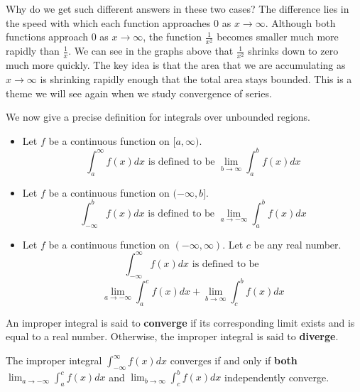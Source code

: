 \documentclass{ximera}
\begin{document}
Why do we get such different answers in these two cases?  The difference lies in the speed with which each function approaches $0$ as $x \to \infty$. Although both functions approach $0$ as $x \to \infty$, the function $\frac{1}{x^2}$ becomes smaller much more rapidly than $\frac{1}{x}$. 
We can see in the graphs above that $\frac{1}{x^2}$ shrinks down to zero much more quickly. The key idea is that the area that we are accumulating as $x\to \infty$ is shrinking rapidly enough that the total area stays bounded. This is a theme we will see again when we study convergence of series. 

We now give a precise definition for integrals over unbounded regions.

\begin{definition}\hfil
\begin{itemize}
\item Let $f$ be a continuous function on $[a,\infty)$.
  \[
  \int_a^\infty f(x) dx \text{ is defined to be } \lim_{b\to\infty}\int_a^b f(x) dx
  \]
\item Let $f$ be a continuous function on $(-\infty,b]$.
  \[
  \int_{-\infty}^b f(x) dx \text{ is defined to be } \lim_{a\to-\infty}\int_a^b f(x) dx
  \]
\item Let $f$ be a continuous function on $(-\infty,\infty)$. Let $c$
  be any real number.
  \[
  \int_{-\infty}^\infty f(x) dx \text{ is defined to be }
  \]
  \[
  \lim_{a\to-\infty}\int_a^c f(x) dx + \lim_{b\to\infty}\int_c^b
  f(x) dx
  \]
\end{itemize}
An improper integral is said to \textbf{converge} if its corresponding
limit exists and is equal to a real number. Otherwise, the improper
integral is said to \textbf{diverge}. 
\end{definition}

\begin{warning}
  The improper integral $  \int_{-\infty}^\infty f(x) dx$ converges if and only if \textbf{both}  $ \lim_{a\to-\infty}\int_a^c f(x) dx$
and $  \lim_{b\to\infty}\int_c^b f(x) dx$
independently converge.
\end{warning}
\end{document}
